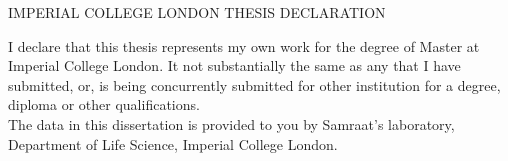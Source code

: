 
\centerline{IMPERIAL COLLEGE LONDON THESIS DECLARATION}
\bigbreak



I declare that this thesis represents my own work for the degree of Master at Imperial College London. It not substantially the same as any that I have submitted, or, is being concurrently submitted for other institution for a degree, diploma or other qualifications. \\

The data in this dissertation is provided to you by Samraat's laboratory, Department of Life Science, Imperial College London. \\
